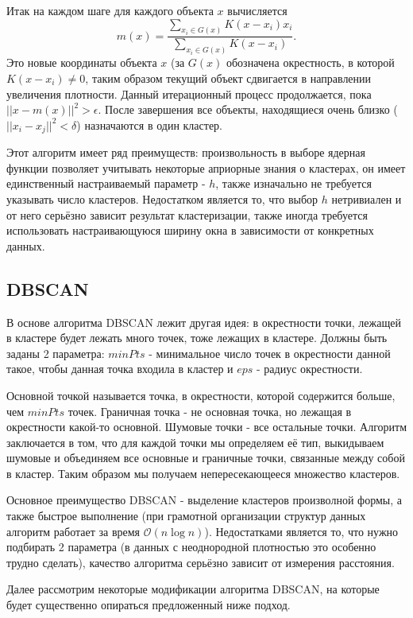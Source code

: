 \documentclass[12pt,fleqn]{article}
\begin{document}
Итак на каждом шаге для каждого объекта $x$ вычисляется 
\begin{equation*}
m(x) = \frac{\sum_{x_i \in G(x)}^{}K(x-x_i)x_i}{\sum_{x_i \in G(x)}^{}K(x-x_i)}.
\end{equation*}
Это новые координаты объекта $x$ (за $G(x)$ обозначена окрестность, в которой $K(x-x_i) \neq 0$, таким образом текущий объект сдвигается в направлении увеличения плотности. Данный итерационный процесс продолжается, пока $||x - m(x)||^2 > \epsilon $. После завершения все объекты, находящиеся очень близко (  $||x_i - x_j||^2 < \delta $) назначаются в один кластер.

Этот алгоритм имеет ряд преимуществ:  произвольность в выборе ядерная функции позволяет учитывать некоторые априорные знания о кластерах, он имеет единственный настраиваемый параметр - $h$, также изначально не требуется указывать число кластеров. Недостатком является то, что выбор $h$ нетривиален и от него серьёзно зависит результат кластеризации, также иногда требуется использовать настраивающуюся ширину окна в зависимости от конкретных данных.


\subsection {DBSCAN}
В основе алгоритма DBSCAN лежит другая идея: в окрестности точки, лежащей в кластере будет лежать много точек, тоже лежащих в кластере.
Должны быть заданы 2 параметра: $minPts$ - минимальное число точек в окрестности данной такое, чтобы данная точка входила в кластер и $eps$ - радиус окрестности.

Основной точкой называется точка, в окрестности, которой содержится больше, чем $minPts$ точек. Граничная точка - не основная точка, но лежащая в окрестности какой-то основной. Шумовые точки - все остальные точки. Алгоритм заключается в том, что для каждой точки мы определяем её тип, выкидываем шумовые и объединяем все основные и граничные точки, связанные между собой в кластер. Таким образом мы получаем непересекающееся множество кластеров.

Основное преимущество DBSCAN - выделение кластеров произволной формы, а также быстрое выполнение (при грамотной организации структур данных алгоритм работает за время $\mathcal{O}(n\log{}n)$). Недостатками является то, что нужно подбирать 2 параметра (в данных с неоднородной плотностью это особенно трудно сделать), качество алгоритма серьёзно зависит от измерения расстояния.


Далее рассмотрим некоторые модификации алгоритма DBSCAN, на которые будет существенно опираться предложенный ниже подход.
\end{document}
